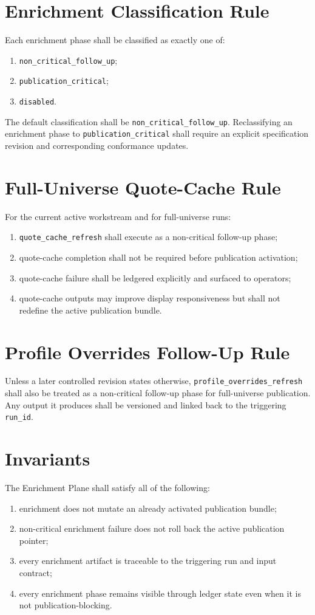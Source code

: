 \section{Enrichment Classification Rule}
Each enrichment phase shall be classified as exactly one of:
\begin{enumerate}[leftmargin=1.2cm]
    \item \texttt{non\_critical\_follow\_up};
    \item \texttt{publication\_critical};
    \item \texttt{disabled}.
\end{enumerate}

The default classification shall be \texttt{non\_critical\_follow\_up}. Reclassifying an enrichment phase to \texttt{publication\_critical} shall require an explicit specification revision and corresponding conformance updates.

\section{Full-Universe Quote-Cache Rule}
For the current active workstream and for full-universe runs:
\begin{enumerate}[leftmargin=1.2cm]
    \item \texttt{quote\_cache\_refresh} shall execute as a non-critical follow-up phase;
    \item quote-cache completion shall not be required before publication activation;
    \item quote-cache failure shall be ledgered explicitly and surfaced to operators;
    \item quote-cache outputs may improve display responsiveness but shall not redefine the active publication bundle.
\end{enumerate}

\section{Profile Overrides Follow-Up Rule}
Unless a later controlled revision states otherwise, \texttt{profile\_overrides\_refresh} shall also be treated as a non-critical follow-up phase for full-universe publication. Any output it produces shall be versioned and linked back to the triggering \texttt{run\_id}.

\section{Invariants}
The Enrichment Plane shall satisfy all of the following:
\begin{enumerate}[leftmargin=1.2cm]
    \item enrichment does not mutate an already activated publication bundle;
    \item non-critical enrichment failure does not roll back the active publication pointer;
    \item every enrichment artifact is traceable to the triggering run and input contract;
    \item every enrichment phase remains visible through ledger state even when it is not publication-blocking.
\end{enumerate}

